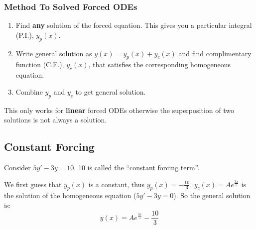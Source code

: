 \documentclass[../main.tex]{subfiles}
\begin{document}
\subsubsection{Method To Solved Forced ODEs}
\begin{enumerate}
  \item Find \textbf{any} solution of the forced equation.
        This gives you a particular integral (P.I.), $y_p(x)$.
  \item Write general solution as $y(x) = y_p(x) + y_c(x)$ and find complimentary function (C.F.), $y_c(x)$, that satisfies the corresponding homogeneous equation.
  \item Combine $y_p$ and $y_c$ to get general solution.
\end{enumerate}
\begin{remark}[Warning]
  This only works for \textbf{linear} forced ODEs otherwise the superposition of two solutions is not always a solution.
\end{remark}
\subsection{Constant Forcing}
\begin{example}
  Consider $5y' - 3y = 10$.
  10 is called the ``constant forcing term''.

  We first guess that $y_p(x)$ is a constant, thus $y_p(x) = - \frac{10}{3}$.
  $y_c(x) = Ae^{\frac{3x}{5}}$ is the solution of the homogeneous equation ($5y' - 3y = 0$).
  So the general solution is:
  \[
    y(x) = Ae^{\frac{3x}{5}} - \frac{10}{3}
  \]
\end{example}
\end{document}
